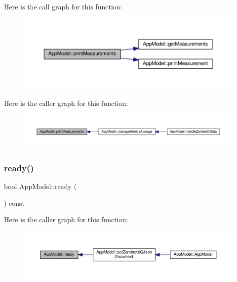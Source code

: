 Here is the call graph for this function\+:\nopagebreak
\begin{figure}[H]
\begin{center}
\leavevmode
\includegraphics[width=350pt]{class_app_model_ac60073d6c96f7471f7227be130033399_cgraph}
\end{center}
\end{figure}
Here is the caller graph for this function\+:\nopagebreak
\begin{figure}[H]
\begin{center}
\leavevmode
\includegraphics[width=350pt]{class_app_model_ac60073d6c96f7471f7227be130033399_icgraph}
\end{center}
\end{figure}
\mbox{\label{class_app_model_a3917fdc3dd8c97715991d9fd1a23abcc}} 
\subsubsection{\texorpdfstring{ready()}{ready()}}
{\footnotesize\ttfamily bool App\+Model\+::ready (\begin{DoxyParamCaption}{ }\end{DoxyParamCaption}) const}

Here is the caller graph for this function\+:\nopagebreak
\begin{figure}[H]
\begin{center}
\leavevmode
\includegraphics[width=350pt]{class_app_model_a3917fdc3dd8c97715991d9fd1a23abcc_icgraph}
\end{center}
\end{figure}
\mbox{\label{class_app_model_a574c2bd6f5c92ac9268107f8399989cb}} 

